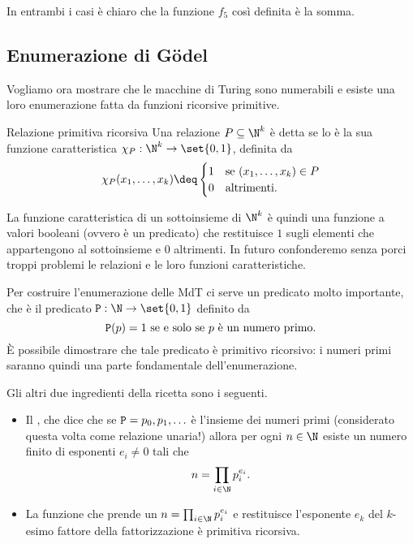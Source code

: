 In entrambi i casi è chiaro che la funzione $f_5$ così definita è la somma.

\subsection{Enumerazione di G\"odel}

Vogliamo ora mostrare che le macchine di Turing sono numerabili e esiste una loro enumerazione fatta da funzioni ricorsive primitive.

\begin{definition}
    {Relazione primitiva ricorsiva}{}
    Una relazione $P \subseteq \N^k$ è detta  se lo è la sua funzione caratteristica $\chi_P : \N^k \to \set{0, 1}$, definita da \[
        \chi_P(x_1, \dots, x_k) \deq \begin{cases}
            1 &\text{se } (x_1, \dots, x_k) \in P\\
            0 &\text{altrimenti}.
        \end{cases}
    \]
\end{definition}

La funzione caratteristica di un sottoinsieme di $\N^k$ è quindi una funzione a valori booleani (ovvero è un predicato) che restituisce $1$ sugli elementi che appartengono al sottoinsieme e $0$ altrimenti. In futuro confonderemo senza porci troppi problemi le relazioni e le loro funzioni caratteristiche.

Per costruire l'enumerazione delle MdT ci serve un predicato molto importante, che è il predicato $\monoP : \N \to \set{0, 1}$ definito da \[
    \mathtt{P}(p) = 1 \text{ se e solo se } p \text{ è un numero primo.} 
\] È possibile dimostrare che tale predicato è primitivo ricorsivo: i numeri primi saranno quindi una parte fondamentale dell'enumerazione.

Gli altri due ingredienti della ricetta sono i seguenti. \begin{itemize}
    \item Il , che dice che se $\mathtt{P} = {p_0, p_1, \dots}$ è l'insieme dei numeri primi (considerato questa volta come relazione unaria!) allora per ogni $n \in \N$ esiste un numero finito di esponenti $e_i \neq 0$ tali che \[
        n = \prod_{i \in \N} p_i^{e_i}.
    \]   
    \item La funzione che prende un $n = \prod_{i \in \N} p_i^{e_i}$ e restituisce l'esponente $e_k$ del $k$-esimo fattore della fattorizzazione è primitiva ricorsiva.  
\end{itemize}

